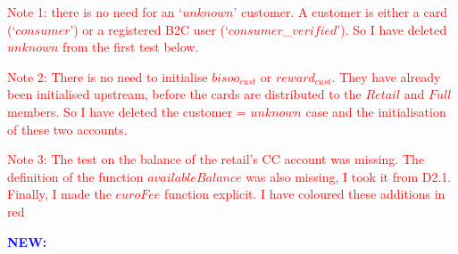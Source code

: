  \textcolor{red}{Note 1: there is no need for an `$unknown$' customer. A customer is either a card (`$consumer$') or a registered B2C user (`$consumer$\_$verified$'). So I have deleted $unknown$ from the first test below.}

\textcolor{red}{Note 2: There is no need to initialise $bisoo_{cust}$ or $reward_{cust}$. They have already been initialised upstream, before the cards are distributed to the $Retail$ and $Full$ members. So I have deleted the customer = $unknown$ case and the initialisation of these two accounts.}

\textcolor{red}{Note 3: The test on the balance of the retail's CC account was missing. The definition of the function $availableBalance$ was also missing, I took it from D2.1. Finally, I made the $euroFee$ function explicit. I have coloured these additions in red}

\textcolor{blue}{\bf NEW:}

